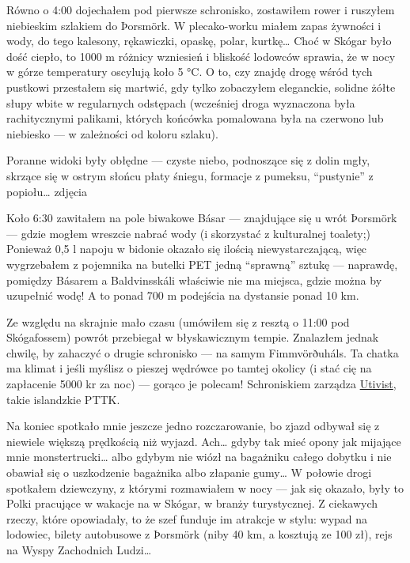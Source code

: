 Równo o 4:00 dojechałem pod pierwsze schronisko, zostawiłem rower i ruszyłem niebieskim szlakiem do Þorsmörk. W plecako-worku miałem zapas żywności i wody, do tego kalesony, rękawiczki, opaskę, polar, kurtkę… Choć w Skógar było dość ciepło, to 1000 m różnicy wzniesień i bliskość lodowców sprawia, że w nocy w górze temperatury oscylują koło 5 °C. O to, czy znajdę drogę wśród tych pustkowi przestałem się martwić, gdy tylko zobaczyłem eleganckie, solidne żółte słupy wbite w regularnych odstępach (wcześniej droga wyznaczona była rachitycznymi palikami, których końcówka pomalowana była na czerwono lub niebiesko --- w zależności od koloru szlaku).

Poranne widoki były obłędne --- czyste niebo, podnoszące się z dolin mgły, skrzące się w ostrym słońcu płaty śniegu, formacje z pumeksu, “pustynie” z popiołu… {zdjęcia}

Koło 6:30 zawitałem na pole biwakowe Básar --- znajdujące się u wrót Þorsmörk --- gdzie mogłem wreszcie nabrać wody (i skorzystać z kulturalnej toalety;) Ponieważ 0,5 l napoju w bidonie okazało się ilością niewystarczającą, więc wygrzebałem z pojemnika na butelki PET jedną “sprawną” sztukę --- naprawdę, pomiędzy Básarem a Baldvinsskáli właściwie nie ma miejsca, gdzie można by uzupełnić wodę! A to ponad 700 m podejścia na dystansie ponad 10 km.

Ze względu na skrajnie mało czasu (umówiłem się z resztą o 11:00 pod Skógafossem) powrót przebiegał w błyskawicznym tempie. Znalazłem jednak chwilę, by zahaczyć o drugie schronisko --- na samym Fimmvörðuháls. Ta chatka ma klimat i jeśli myślisz o pieszej wędrówce po tamtej okolicy (i stać cię na zapłacenie 5000 kr za noc) --- gorąco je polecam! Schroniskiem zarządza \href{http://www.utivist.is/english}{Utivist}, takie islandzkie PTTK.

Na koniec spotkało mnie jeszcze jedno rozczarowanie, bo zjazd odbywał się z niewiele większą prędkością niż wyjazd. Ach… gdyby tak mieć opony jak mijające mnie monstertrucki… albo gdybym nie wiózł na bagażniku całego dobytku i nie obawiał się o uszkodzenie bagażnika albo złapanie gumy… W połowie drogi spotkałem dziewczyny, z którymi rozmawiałem w nocy --- jak się okazało, były to Polki pracujące w wakacje na w Skógar, w branży turystycznej. Z ciekawych rzeczy, które opowiadały, to że szef funduje im atrakcje w stylu: wypad na lodowiec, bilety autobusowe z Þorsmörk (niby 40 km, a kosztują ze 100 zł), rejs na Wyspy Zachodnich Ludzi…


